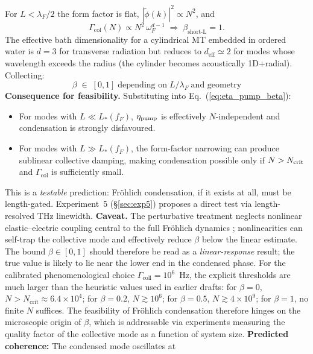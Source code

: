 \documentclass[twocolumn,10pt]{article}
\begin{document}
For $L<\lambda_F/2$ the form factor is flat,
$|\tilde\phi(k)|^2\propto N^2$, and
\begin{equation}
\Gamma_{\text{col}}(N)\propto N^2\,\omega_F^{d-1}
\;\Rightarrow\;\beta_{\text{short-L}}=1.
\end{equation}
The effective bath dimensionality for a cylindrical MT embedded in
ordered water is $d=3$ for transverse radiation but reduces to
$d_{\text{eff}}\simeq 2$ for modes whose wavelength exceeds the radius
(the cylinder becomes acoustically 1D+radial). Collecting:
\begin{equation}
\boxed{\;\beta\;\in\;[0,1]\;\text{depending on}\;L/\lambda_F\;\text{and
geometry}\;}
\end{equation}
\textbf{Consequence for feasibility.} Substituting into
Eq.~(\ref{eq:eta_pump_beta}):
\begin{itemize}
\item For modes with $L\ll L_*(f_F)$, $\eta_{\rm pump}$ is effectively
$N$-independent and condensation is strongly disfavoured.

\item For modes with $L\gg L_*(f_F)$, the form-factor narrowing can produce
sublinear collective damping, making condensation possible only if
$N>N_{\rm crit}$ and $\Gamma_{\text{col}}$ is sufficiently small.
\end{itemize}
This is a \emph{testable} prediction: Fr\"ohlich condensation, if it
exists at all, must be length-gated. Experiment~5 (\S\ref{sec:exp5})
proposes a direct test via length-resolved THz linewidth.
\textbf{Caveat.} The perturbative treatment neglects nonlinear
elastic--electric coupling central to the full Fr\"ohlich dynamics
\cite{Pokorn2011}; nonlinearities can self-trap the collective mode and
effectively reduce $\beta$ below the linear estimate. The bound
$\beta\in[0,1]$ should therefore be read as a \emph{linear-response}
result; the true value is likely to lie near the lower end in the
condensed phase.
For the calibrated phenomenological choice $\Gamma_{\text{coll}}=10^6$~Hz,
the explicit thresholds are much larger than the heuristic values used in
earlier drafts: for $\beta = 0$, $N > N_{\text{crit}} \approx 6.4\times 10^4$;
for $\beta = 0.2$, $N \gtrsim 10^6$; for $\beta = 0.5$, $N \gtrsim 4\times 10^9$; for
$\beta = 1$, no finite $N$ suffices. The feasibility of Fr\"ohlich
condensation therefore hinges on the microscopic origin of $\beta$, which
is addressable via experiments measuring the quality factor of the
collective mode as a function of system size.
\textbf{Predicted coherence:} The condensed mode oscillates at
\end{document}
